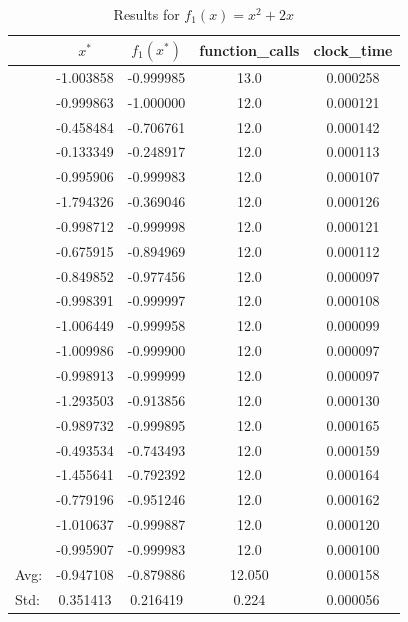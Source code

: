 \documentclass[11pt,onside]{article}
\begin{document}
\begin{description}
\begin {table}[H]
\centering
\caption {Results for $f_{1}(x) = x^2 + 2x$}
\begin{tabular}{lcccc}
\toprule
{} &    $x^*$ &     $f_{1}(x^*)$ &  function\_calls &  clock\_time \\
\midrule
  & -1.003858 & -0.999985 &            13.0 &    0.000258 \\
  & -0.999863 & -1.000000 &            12.0 &    0.000121 \\
  & -0.458484 & -0.706761 &            12.0 &    0.000142 \\
  & -0.133349 & -0.248917 &            12.0 &    0.000113 \\
  & -0.995906 & -0.999983 &            12.0 &    0.000107 \\
  & -1.794326 & -0.369046 &            12.0 &    0.000126 \\
  & -0.998712 & -0.999998 &            12.0 &    0.000121 \\
  & -0.675915 & -0.894969 &            12.0 &    0.000112 \\
  & -0.849852 & -0.977456 &            12.0 &    0.000097 \\
  & -0.998391 & -0.999997 &            12.0 &    0.000108 \\
  & -1.006449 & -0.999958 &            12.0 &    0.000099 \\
  & -1.009986 & -0.999900 &            12.0 &    0.000097 \\
  & -0.998913 & -0.999999 &            12.0 &    0.000097 \\
  & -1.293503 & -0.913856 &            12.0 &    0.000130 \\
  & -0.989732 & -0.999895 &            12.0 &    0.000165 \\
  & -0.493534 & -0.743493 &            12.0 &    0.000159 \\
  & -1.455641 & -0.792392 &            12.0 &    0.000164 \\
  & -0.779196 & -0.951246 &            12.0 &    0.000162 \\
  & -1.010637 & -0.999887 &            12.0 &    0.000120 \\
  & -0.995907 & -0.999983 &            12.0 &    0.000100 \\
\bottomrule
Avg: & -0.947108 & -0.879886 & 12.050 & 0.000158 \\
Std: & 0.351413 & 0.216419 & 0.224 & 0.000056 \\
\bottomrule
\end{tabular}
\end{table}



\end{description}
\end{document}

